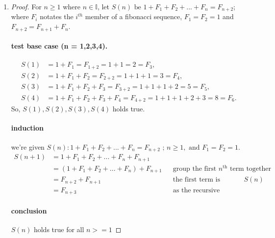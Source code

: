 \documentclass{article}
\theoremstyle{remark}
\begin{document}
  \begin{enumerate}
      \item[(I)] 
        \begin{proof}

        For $n \geq 1$ where $n \in \mathbb{I}$, let $S(n) \text{ be } 1 + F_1 + F_2 + ... + F_n = F_{n+2}$; where $F_i$ notates the $i^{th}$ member of a fibonacci sequence, $F_1 = F_2 = 1$ and $F_{n+2} = F_{n+1} + F_n$. \\

        \paragraph{test base case (n = 1,2,3,4).}
          \begin{align*}
          S(1) &= 1 + F_1 = F_{1+2} = 1 + 1 = 2 = F_3,\\
          S(2) &= 1 + F_1 + F_2 = F_{2+2} = 1 + 1 + 1 = 3 = F_4,\\
          S(3) &= 1 + F_1 + F_2 + F_3 = F_{3+2} = 1 + 1 + 1 + 2 = 5 = F_5,\\
          S(4) &= 1 + F_1 + F_2 + F_3 + F_4 = F_{4+2} = 1 + 1 + 1 + 2 + 3 = 8 = F_6.
          \end{align*}  
        So, $S(1), S(2), S(3), S(4)$ holds true.

        \newpage
        \paragraph{induction}
          we're given $S(n): 1 + F_1 + F_2 + ... + F_n = F_{n+2} \text{ ; } n \geq 1, \text{ and } F_1 = F_2 = 1$. 
        \begin{align*}
        S(n+1)  &= 1 + F_1 + F_2 + ... + F_n + F_{n+1} \\
                &= (1 + F_1 + F_2 + ... + F_n) + F_{n+1}
                && \text{group the first $n^{\text{th}}$ term together} \\
                &= F_{n+2} + F_{n+1}
                && \text{the first term is equivalent to } S(n) \\
                &= F_{n+3}  
                && \text{as the recursive relation of a fibonacci sequence}
        \end{align*}

        \paragraph{conclusion} $S(n)$ holds true for all $n >= 1$


\end{proof}
\end{enumerate}
\end{document}
